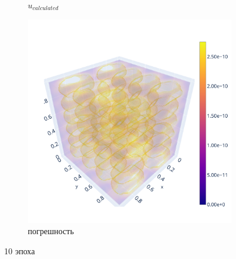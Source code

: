 \documentclass[a4paper,hidelinks,12pt]{article}
\begin{document}
\begin{figure}[H]
\begin{subfigure}{.33\textwidth}
  \caption{$u_{calculated}$}
\end{subfigure}%
\begin{subfigure}{.33\textwidth}
  \centering
  \includegraphics[width=\linewidth]{pictures/10_L1_128_diff.png}
  \caption{погрешность}
\end{subfigure}%
\caption{10 эпоха}
\label{fig:fig}
\end{figure}
\end{document}
